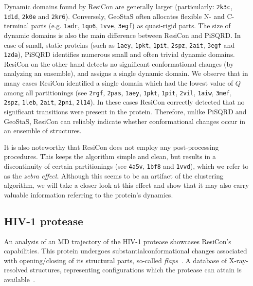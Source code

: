 \documentclass[a4paper,11pt,twoside]{book}%
\begin{document}
Dynamic domains found by ResiCon are generally larger (particularly: \texttt{2k3c}, \texttt{1d1d}, \texttt{2k0e} and \texttt{2kr6}).
Conversely, GeoStaS often allocates flexible N- and C-terminal parts (e.g. \texttt{1adr}, \texttt{1qo6}, \texttt{1vve}, \texttt{3egf}) as quasi-rigid parts.
The size of dynamic domains is also the main difference between ResiCon and PiSQRD.
In case of small, static proteins (such as \texttt{1aey}, \texttt{1pkt}, \texttt{1pit}, \texttt{2spz}, \texttt{2ait}, \texttt{3egf} and \texttt{1zda}), PiSQRD identifies numerous small and often trivial dynamic domains. 
ResiCon on the other hand detects no significant conformational changes (by analyzing an ensemble), and assigns a single dynamic domain.
We observe that in many cases ResiCon identified a single domain which had the lowest value of $Q$ among all partitionings (see \texttt{2rgf}, \texttt{2pas}, \texttt{1aey}, \texttt{1pkt}, \texttt{1pit}, \texttt{2vil}, \texttt{1aiw}, \texttt{3mef}, \texttt{2spz}, \texttt{1leb}, \texttt{2ait}, \texttt{2pni}, \texttt{2l14}).
In these cases ResiCon correctly detected that no significant transitions were present in the protein.
Therefore, unlike PiSQRD and GeoStaS, ResiCon can reliably indicate whether conformational changes occur in an ensemble of structures.

It is also noteworthy that ResiCon does not employ any post-processing procedures.
This keeps the algorithm simple and clean, but results in a discontinuity of certain partitionings (see \texttt{4a5v}, \texttt{1bf8} and \texttt{1vvd}), which we refer to as the \emph{zebra effect}.
Although this seems to be an artifact of the clustering algorithm, we will take a closer look at this effect and show that it may also carry valuable information referring to the protein's dynamics.

\subsection*{HIV-1 protease}
An analysis of an MD trajectory of the HIV-1 protease showcases ResiCon's capabilities.
This protein undergoes substantial\break conformational changes associated with opening/closing of its structural parts, so-called \emph{flaps}~\cite{hamelberg2005fast}.
A database of X-ray-resolved structures, representing configurations which the protease can attain is available~\cite{vondrasek2002hivdb}.
\end{document}

